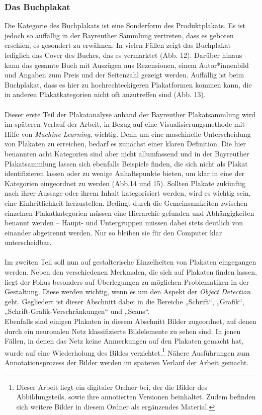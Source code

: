 \documentclass[a4paper,12pt,ngerman]{article}
\begin{document}
\subsubsection{Das Buchplakat}
Die Kategorie des Buchplakats ist eine Sonderform des Produktplakats. Es ist jedoch so auffällig in der Bayreuther Sammlung vertreten, dass es geboten erschien, es gesondert zu erwähnen. In vielen Fällen zeigt das Buchplakat lediglich das Cover des Buches, das es vermarktet (Abb. 12). Darüber hinaus kann das gesamte Buch mit Auszügen aus Rezensionen, einem Autor*innenbild und Angaben zum Preis und der Seitenzahl gezeigt werden. Auffällig ist beim Buchplakat, dass es hier zu hochrechteckigeren Plakatformen kommen kann, die in anderen Plakatkategorien nicht oft anzutreffen sind (Abb. 13). \\
\\
Dieser erste Teil der Plakatanalyse anhand der Bayreuther Plakatsammlung wird im späteren Verlauf der Arbeit, in Bezug auf eine Visualisierungsmethode mit Hilfe von \textit{Machine Learning}, wichtig. Denn um eine maschinelle Unterscheidung von Plakaten zu erreichen, bedarf es zunächst einer klaren Definition. Die hier benannten acht Kategorien sind aber nicht allumfassend und in der Bayreuther Plakatsammlung lassen sich ebenfalls Beispiele finden, die sich nicht als Plakat identifizieren lassen oder zu wenige Anhaltspunkte bieten, um klar in eine der Kategorien eingeordnet zu werden (Abb.14 und 15). Sollten Plakate zukünftig nach ihrer Aussage oder ihrem Inhalt kategorisiert werden, wird es wichtig sein, eine Einheitlichkeit herzustellen. Bedingt durch die Gemeinsamkeiten zwischen einzelnen Plakatkategorien müssen eine Hierarchie gefunden und Abhängigkeiten benannt werden -- Haupt- und Untergruppen müssen dabei stets deutlich von einander abgetrennt werden. Nur so bleiben sie für den Computer klar unterscheidbar.\\
\\
Im zweiten Teil soll nun auf gestalterische Einzelheiten von Plakaten eingegangen werden. Neben den verschiedenen Merkmalen, die sich auf Plakaten finden lassen, liegt der Fokus besonders auf Überlegungen zu möglichen Problematiken in der Gestaltung. Diese werden wichtig, wenn es um den Aspekt der \textit{Object Detection} geht. Gegliedert ist dieser Abschnitt dabei in die Bereiche „Schrift“, „Grafik“, „Schrift-Grafik-Verschränkungen“ und „Scans“. \\
Ebenfalls sind einigen Plakaten in diesem Abschnitt Bilder zugeordnet, auf denen durch ein neuronalen Netz klassifizierte Bildelemente zu sehen sind. In jenen Fällen, in denen das Netz keine Anmerkungen auf den Plakaten gemacht hat, wurde auf eine Wiederholung des Bildes verzichtet.\footnote{Dieser Arbeit liegt ein digitaler Ordner bei, der die Bilder des Abbildungsteils, sowie ihre annotierten Versionen beinhaltet. Zudem befinden sich weitere Bilder in diesem Ordner als ergänzendes Material.}  Nähere Ausführungen zum Annotationsprozess der Bilder werden im späteren Verlauf der Arbeit gemacht. \\
\end{document}
